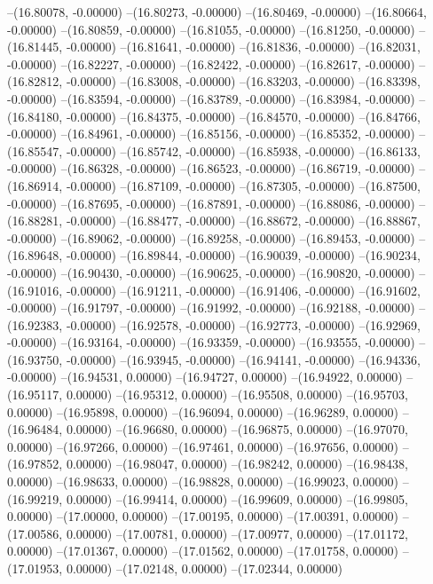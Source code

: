 --(16.80078, -0.00000)
--(16.80273, -0.00000)
--(16.80469, -0.00000)
--(16.80664, -0.00000)
--(16.80859, -0.00000)
--(16.81055, -0.00000)
--(16.81250, -0.00000)
--(16.81445, -0.00000)
--(16.81641, -0.00000)
--(16.81836, -0.00000)
--(16.82031, -0.00000)
--(16.82227, -0.00000)
--(16.82422, -0.00000)
--(16.82617, -0.00000)
--(16.82812, -0.00000)
--(16.83008, -0.00000)
--(16.83203, -0.00000)
--(16.83398, -0.00000)
--(16.83594, -0.00000)
--(16.83789, -0.00000)
--(16.83984, -0.00000)
--(16.84180, -0.00000)
--(16.84375, -0.00000)
--(16.84570, -0.00000)
--(16.84766, -0.00000)
--(16.84961, -0.00000)
--(16.85156, -0.00000)
--(16.85352, -0.00000)
--(16.85547, -0.00000)
--(16.85742, -0.00000)
--(16.85938, -0.00000)
--(16.86133, -0.00000)
--(16.86328, -0.00000)
--(16.86523, -0.00000)
--(16.86719, -0.00000)
--(16.86914, -0.00000)
--(16.87109, -0.00000)
--(16.87305, -0.00000)
--(16.87500, -0.00000)
--(16.87695, -0.00000)
--(16.87891, -0.00000)
--(16.88086, -0.00000)
--(16.88281, -0.00000)
--(16.88477, -0.00000)
--(16.88672, -0.00000)
--(16.88867, -0.00000)
--(16.89062, -0.00000)
--(16.89258, -0.00000)
--(16.89453, -0.00000)
--(16.89648, -0.00000)
--(16.89844, -0.00000)
--(16.90039, -0.00000)
--(16.90234, -0.00000)
--(16.90430, -0.00000)
--(16.90625, -0.00000)
--(16.90820, -0.00000)
--(16.91016, -0.00000)
--(16.91211, -0.00000)
--(16.91406, -0.00000)
--(16.91602, -0.00000)
--(16.91797, -0.00000)
--(16.91992, -0.00000)
--(16.92188, -0.00000)
--(16.92383, -0.00000)
--(16.92578, -0.00000)
--(16.92773, -0.00000)
--(16.92969, -0.00000)
--(16.93164, -0.00000)
--(16.93359, -0.00000)
--(16.93555, -0.00000)
--(16.93750, -0.00000)
--(16.93945, -0.00000)
--(16.94141, -0.00000)
--(16.94336, -0.00000)
--(16.94531, 0.00000)
--(16.94727, 0.00000)
--(16.94922, 0.00000)
--(16.95117, 0.00000)
--(16.95312, 0.00000)
--(16.95508, 0.00000)
--(16.95703, 0.00000)
--(16.95898, 0.00000)
--(16.96094, 0.00000)
--(16.96289, 0.00000)
--(16.96484, 0.00000)
--(16.96680, 0.00000)
--(16.96875, 0.00000)
--(16.97070, 0.00000)
--(16.97266, 0.00000)
--(16.97461, 0.00000)
--(16.97656, 0.00000)
--(16.97852, 0.00000)
--(16.98047, 0.00000)
--(16.98242, 0.00000)
--(16.98438, 0.00000)
--(16.98633, 0.00000)
--(16.98828, 0.00000)
--(16.99023, 0.00000)
--(16.99219, 0.00000)
--(16.99414, 0.00000)
--(16.99609, 0.00000)
--(16.99805, 0.00000)
--(17.00000, 0.00000)
--(17.00195, 0.00000)
--(17.00391, 0.00000)
--(17.00586, 0.00000)
--(17.00781, 0.00000)
--(17.00977, 0.00000)
--(17.01172, 0.00000)
--(17.01367, 0.00000)
--(17.01562, 0.00000)
--(17.01758, 0.00000)
--(17.01953, 0.00000)
--(17.02148, 0.00000)
--(17.02344, 0.00000)
